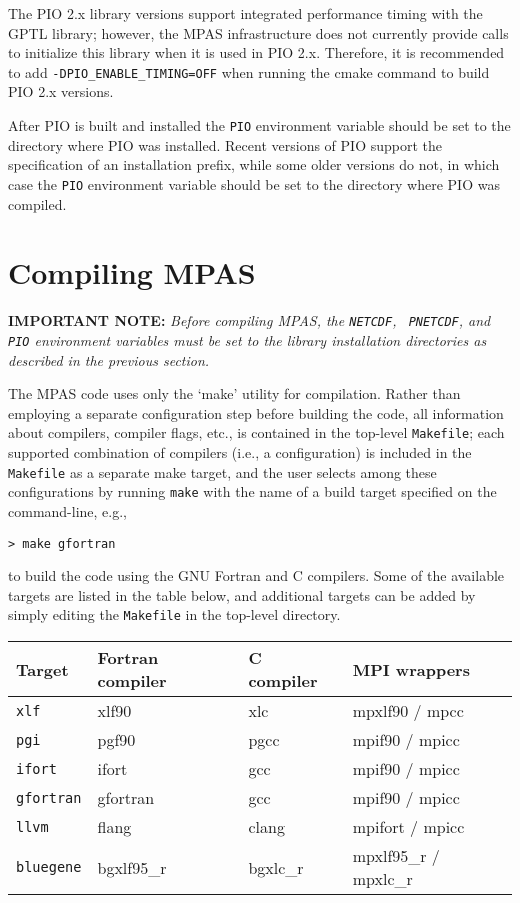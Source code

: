 The PIO 2.x library versions support integrated performance timing with the GPTL library; however,
the MPAS infrastructure does not currently provide calls to initialize this library when it is used in PIO 2.x.
Therefore, it is recommended to add {\tt -DPIO\_ENABLE\_TIMING=OFF} when running the cmake command
to build PIO 2.x versions.

After PIO is built and installed the {\tt PIO} environment variable should be set to 
the directory where PIO was installed. Recent versions of PIO support the specification of an installation
prefix, while some older versions do not, in which case the {\tt PIO} environment variable should
be set to the directory where PIO was compiled.

\section{Compiling MPAS}
\label{compiling_MPAS}

{\bf IMPORTANT NOTE:} {\em Before compiling MPAS, the {\tt NETCDF}, {\tt
PNETCDF}, and {\tt PIO} environment variables must be set to the library
installation directories as described in the previous section.} \vspace{12pt}

The MPAS code uses only the `make' utility for compilation. Rather than
employing a separate configuration step before building the code, all
information about compilers, compiler flags, etc., is contained in the top-level
{\tt Makefile}; each supported combination of compilers (i.e., a configuration)
is included in the {\tt Makefile} as a separate make target, and the user
selects among these configurations by running {\tt make} with the name of a
build target specified on the command-line, e.g.,

\vspace{12pt}
{\tt > make gfortran}
\vspace{12pt}

\noindent to build the code using the GNU Fortran and C compilers. Some of the
available targets are listed in the table below, and additional targets can be
added by simply editing the {\tt Makefile} in the top-level directory.

\vspace{12pt}
\begin{longtable}{| l | l | l | l |}
\hline
Target & Fortran compiler & C compiler & MPI wrappers \\ \hline \hline
{\tt xlf} & xlf90 & xlc & mpxlf90 / mpcc \\ \hline
{\tt pgi} & pgf90 & pgcc & mpif90 / mpicc \\ \hline
{\tt ifort} & ifort & gcc & mpif90 / mpicc \\ \hline
{\tt gfortran} & gfortran & gcc & mpif90 / mpicc \\ \hline
{\tt llvm} & flang & clang & mpifort / mpicc \\ \hline
{\tt bluegene} & bgxlf95\_r & bgxlc\_r & mpxlf95\_r / mpxlc\_r \\ \hline
\end{longtable}
\vspace{12pt}

